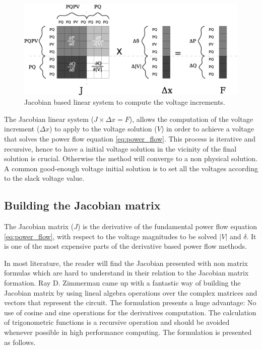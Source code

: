 \documentclass[a4paper,twoside,fleqn]{tufte-book}
\begin{document}
\begin{center}
\begin{figure}[h!]
  \includegraphics[width=0.9\linewidth]{img/JacobianBased.eps}
  \caption{Jacobian based linear system to compute the voltage increments.}
  \label{fig:jacobian_based}
\end{figure}
\end{center}

The Jacobian linear system ($J \times \Delta x = F$), allows the computation of the voltage increment ($\Delta x$) to apply to the voltage solution ($V$) in order to achieve a voltage that solves the power flow equation \ref{eq:power_flow}. This process is iterative and recursive, hence to have a initial voltage solution in the vicinity of the final solution is crucial. Otherwise the method will converge to a non physical solution. A common good-enough voltage initial solution is to set all the voltages according to the slack voltage value.


\subsection{Building the Jacobian matrix} \label{Jacobian_chapter}

The Jacobian matrix ($J$) is the derivative of the fundamental power flow equation \ref{eq:power_flow}, with respect to the voltage magnitudes to be solved $|V|$ and $\delta$. It is one of the most expensive parts of the derivative based power flow methods.

In most literature, the reader will find the Jacobian presented with non matrix formulas which are hard to understand in their relation to the Jacobian matrix formation. Ray D. Zimmerman came up with a fantastic way of building the Jacobian matrix \cite{zimmerman2010ac} by using lineal algebra operations over the complex matrices and vectors that represent the circuit. The formulation presents a huge advantage: No use of cosine and sine operations for the derivatives computation. The calculation of trigonometric functions is a recursive operation and should be avoided whenever possible in high performance computing. The formulation is presented as follows.
\end{document}
